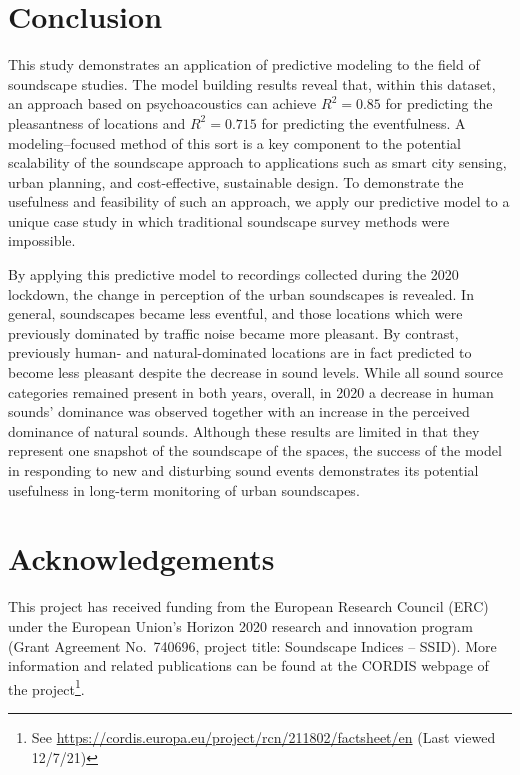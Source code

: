 \documentclass[
  authoryear,
  preprint,
  3p,
  onecolumn]{elsarticle}
\begin{document}
\hypertarget{conclusion}{%
\section{Conclusion}\label{conclusion}}

This study demonstrates an application of predictive modeling to the
field of soundscape studies. The model building results reveal that,
within this dataset, an approach based on psychoacoustics can achieve
\(R^2 = 0.85\) for predicting the pleasantness of locations and
\(R^2 = 0.715\) for predicting the eventfulness. A modeling--focused
method of this sort is a key component to the potential scalability of
the soundscape approach to applications such as smart city sensing,
urban planning, and cost-effective, sustainable design. To demonstrate
the usefulness and feasibility of such an approach, we apply our
predictive model to a unique case study in which traditional soundscape
survey methods were impossible.

By applying this predictive model to recordings collected during the
2020 lockdown, the change in perception of the urban soundscapes is
revealed. In general, soundscapes became less eventful, and those
locations which were previously dominated by traffic noise became more
pleasant. By contrast, previously human- and natural-dominated locations
are in fact predicted to become less pleasant despite the decrease in
sound levels. While all sound source categories remained present in both
years, overall, in 2020 a decrease in human sounds' dominance was
observed together with an increase in the perceived dominance of natural
sounds. Although these results are limited in that they represent one
snapshot of the soundscape of the spaces, the success of the model in
responding to new and disturbing sound events demonstrates its potential
usefulness in long-term monitoring of urban soundscapes.

\hypertarget{acknowledgements}{%
\section*{Acknowledgements}\label{acknowledgements}}

This project has received funding from the European Research Council
(ERC) under the European Union's Horizon 2020 research and innovation
program (Grant Agreement No.~740696, project title: Soundscape Indices
-- SSID). More information and related publications can be found at the
CORDIS webpage of the project\footnote{See
  \url{https://cordis.europa.eu/project/rcn/211802/factsheet/en} (Last
  viewed 12/7/21)}.
\end{document}
